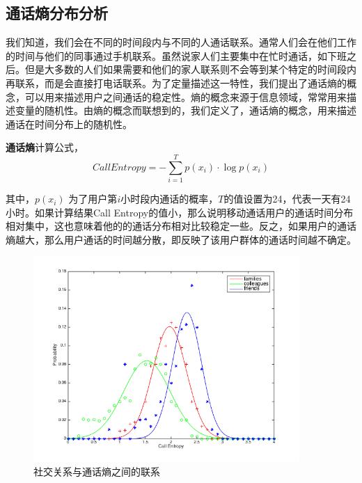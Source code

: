\subsection{通话熵分布分析}

我们知道，我们会在不同的时间段内与不同的人通话联系。通常人们会在他们工作的时间与他们的同事通过手机联系。虽然说家人们主要集中在忙时通话，如下班之后。但是大多数的人们如果需要和他们的家人联系则不会等到某个特定的时间段内再联系，而是会直接打电话联系。为了定量描述这一特性，我们提出了通话熵的概念，可以用来描述用户之间通话的稳定性。熵的概念来源于信息领域，常常用来描述变量的随机性。由熵的概念而联想到的，我们定义了，通话熵的概念，用来描述通话在时间分布上的随机性。

\begin{definition}
    \label{call-entrpy-concept}
    \textbf{通话熵}计算公式，
    \begin{equation}
        CallEntropy = - \sum_{i=1}^{T}p(x_i)\cdot\log p(x_i)
    \end{equation}
\end{definition}


其中，$p(x_i)$ 为了用户第$i$小时段内通话的概率，$T$的值设置为24，代表一天有24小时。如果计算结果Call Entropy的值小，那么说明移动通话用户的通话时间分布相对集中，这也意味着他的的通话分布相对比较稳定一些。反之，如果用户的通话熵越大，那么用户通话的时间越分散，即反映了该用户群体的通话时间越不确定。


\begin{figure}[!ht]
    \centering
    \includegraphics[scale=1,width=0.9\textwidth]{figure/CallEntropyDistribution.png}
    \caption{社交关系与通话熵之间的联系}
    \label{fig-call-entropy}
\end{figure}


